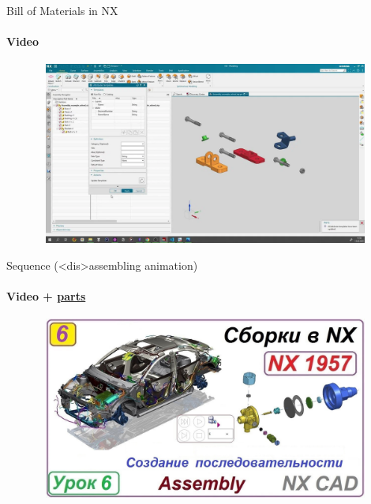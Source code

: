 \documentclass[aspectratio=169]{beamer}
\newcommand{\fbckg}[1]{\usebackgroundtemplate{\texttt{[image: \#1]}}}%
\begin{document}
\begin{frame}[t]{Bill of Materials in NX}
    \framesubtitle{Video}
    \vspace{-0.6cm}
    \begin{figure}[H]
        \href{https://disk.yandex.ru/i/xTmHh9jwxI5GPw}{
            \centering\includegraphics[height=6cm,width=1\textwidth,keepaspectratio]{bom_preview.png}}
        \label{fig:bom_preview.png}
    \end{figure}
\end{frame}

\begin{frame}[t]{Sequence (<dis>assembling animation)}
    \framesubtitle{Video + \href{https://disk.yandex.ru/d/xcp_aGWRvPgLEA}{parts}}
    \vspace{-0.6cm}
    \begin{figure}[H]
        \href{https://disk.yandex.ru/i/fDUp5zSG3iDofA}{
            \centering\includegraphics[height=6cm,width=1\textwidth,keepaspectratio]{sequence_preview.jpg}}
        \label{fig:sequence_preview.jpg}
    \end{figure}
\end{frame}

\fbckg{fibeamer/figs/last_page.png}
\frame[plain]{}
\end{document}
